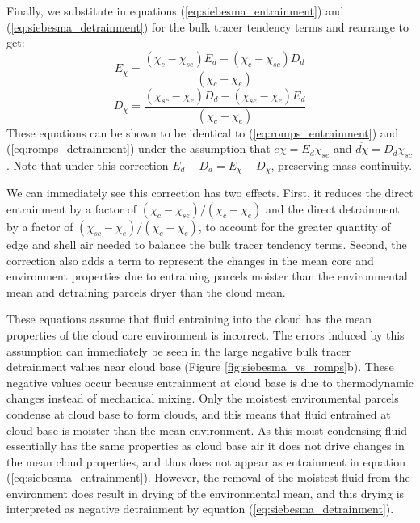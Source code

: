 \documentclass[draft,grl]{agutex}
\begin{document}
\begin{article}
Finally, we substitute in equations (\ref{eq:siebesma_entrainment}) and 
(\ref{eq:siebesma_detrainment}) for the bulk tracer tendency terms and 
rearrange to get:
\begin{equation}
  \label{eq:inverted_entrainment}
    E_{\chi} = \frac{(\chi_{c} - \chi_{se})E_d - (\chi_{c} - \chi_{sc})D_d}
             {(\chi_{c} - \chi_{e})}
\end{equation}
\begin{equation}
  \label{eq:inverted_detrainment}
    D_{\chi} = \frac{(\chi_{sc} - \chi_{e})D_d - (\chi_{se} - \chi_{e})E_d}
             {(\chi_{c} - \chi_{e})}
\end{equation}
These equations can be shown to be identical to (\ref{eq:romps_entrainment}) 
and (\ref{eq:romps_detrainment}) under the assumption that 
$\overline{e\chi} = E_d \chi_{se}$ and $\overline{d\chi} = D_d \chi_{sc}$.
Note that under this correction $E_d-D_d = E_{\chi}-D_{\chi}$, preserving 
mass continuity.

We can immediately see this correction has two effects.  First, it reduces
the direct entrainment by a factor of
$(\chi_{c} - \chi_{se})/(\chi_{c} - \chi_{e})$ and the direct detrainment 
by a factor of $(\chi_{sc} - \chi_{e})/(\chi_{c} - \chi_{e})$, to account for 
the greater quantity of edge and shell air needed to balance the bulk tracer 
tendency terms.  Second, the correction also adds a term to represent the 
changes in the mean core and environment properties due to entraining parcels 
moister than the environmental mean and detraining parcels dryer than the cloud 
mean.  



These equations assume that fluid entraining into the cloud has the mean 
properties of the cloud core environment is incorrect.  The errors induced by 
this assumption can immediately be seen in the large negative bulk tracer 
detrainment values near cloud base (Figure \ref{fig:siebesma_vs_romps}b).  
These negative values occur because entrainment at cloud base is due to 
thermodynamic changes instead of mechanical mixing.  Only the moistest 
environmental parcels condense at cloud base to form clouds, and this means 
that fluid entrained at cloud base is moister than the mean environment.  As 
this moist condensing fluid essentially has the same properties as cloud base 
air it does not drive changes in the mean cloud properties, and thus does not 
appear as entrainment in equation (\ref{eq:siebesma_entrainment}).  However, the 
removal of the moistest fluid from the environment does result in drying of 
the environmental mean, and this drying is interpreted as negative 
detrainment by equation (\ref{eq:siebesma_detrainment}).




\end{article}
\end{document}
